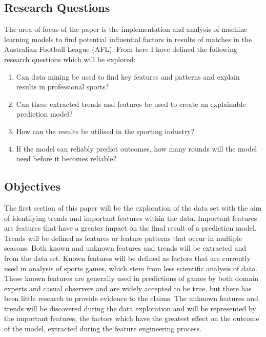 \documentclass{imc-inf}
\begin{document}
	\subsection{Research Questions}
	
	The area of focus of the paper is the implementation and analysis of machine learning models to find potential influential factors in results of matches in the Australian Football League (AFL).
	From here I have defined the following research questions which will be explored:
	\begin{enumerate}
		
		\item[] Can data mining be used to find key features and patterns and explain results in professional sports?
		
		\item[]Can these extracted trends and features be used to create an explainable prediction model?
		
		\item[] How can the results be utilised in the sporting industry?
		
		\item[] If the model can reliably predict outcomes, how many rounds will the model need before it becomes reliable?
	\end{enumerate}
	
	
	\subsection{Objectives}
	The first section of this paper will be the exploration of the data set with the aim of identifying trends and important features within the data. Important features are features that have a greater impact on the final result of a prediction model. Trends will be defined as features or feature patterns that occur in multiple seasons. Both known and unknown features and trends will be extracted and from the data set. Known features will be defined as factors that are currently used in analysis of sports games, which stem from less scientific analysis of data. These known features are generally used in predictions of games by both domain experts and casual observers and are widely accepted to be true, but there has been little research to provide evidence to the claims. The unknown features and trends will be discovered during the data exploration and will be represented by the important features, the factors which have the greatest effect on the outcome of the model, extracted during the feature engineering process.\linebreak
		
\end{document}
